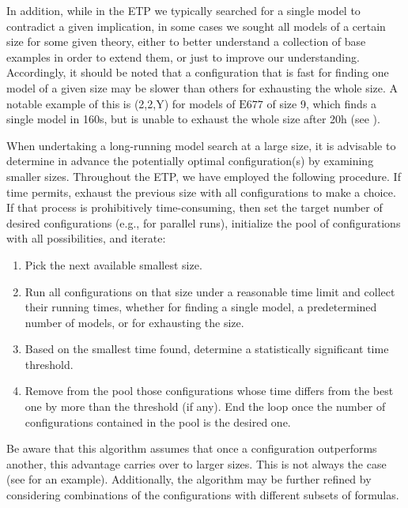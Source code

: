 \documentclass[12pt]{amsart}
\theoremstyle{definition}
\newcommand{\Eq}[1]{\mathrm{E}#1}
\begin{document}
In addition, while in the ETP we typically searched for a single model to contradict a given implication, in some cases we sought all models of a certain size for some given theory, either to better understand a collection of base examples in order to extend them, or just to improve our understanding. Accordingly, it should be noted that a configuration that is fast for finding one model of a given size may be slower than others for exhausting the whole size. A notable example of this is (2,2,Y) for models of $\Eq{677}$ of size 9, which finds a single model in 160s, but is unable to exhaust the whole size after 20h (see ).

When undertaking a long-running model search at a large size, it is advisable to determine in advance the potentially optimal configuration(s) by examining smaller sizes. Throughout the ETP, we have employed the following procedure. If time permits, exhaust the previous size with all configurations to make a choice. If that process is prohibitively time-consuming, then set the target number of desired configurations (e.g., for parallel runs), initialize the pool of configurations with all possibilities, and iterate:
\begin{enumerate}
\item Pick the next available smallest size.
\item Run all configurations on that size under a reasonable time limit and collect their running times, whether for finding a single model, a predetermined number of models, or for exhausting the size.
\item Based on the smallest time found, determine a statistically significant time threshold.
\item Remove from the pool those configurations whose time differs from the best one by more than the threshold (if any). End the loop once the number of configurations contained in the pool is the desired one.
\end{enumerate}
Be aware that this algorithm assumes that once a configuration outperforms another, this advantage carries over to larger sizes. This is not always the case (see  for an example). Additionally, the algorithm may be further refined by considering combinations of the configurations with different subsets of formulas.
\end{document}
